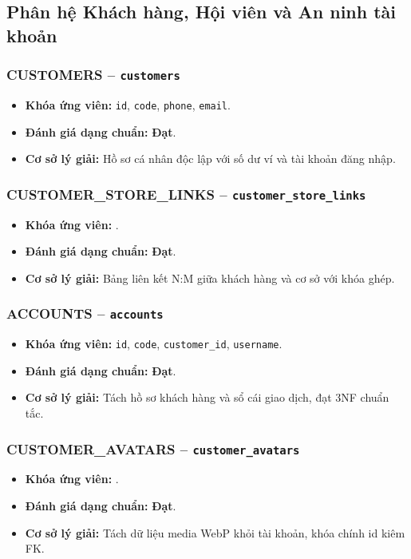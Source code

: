 \subsection{Phân hệ Khách hàng, Hội viên và An ninh tài khoản}
\subsubsection{CUSTOMERS -- \texttt{customers}}
\begin{itemize}
  \item \textbf{Khóa ứng viên:} \texttt{id}, \texttt{code}, \texttt{phone}, \texttt{email}.
  \item \textbf{Đánh giá dạng chuẩn:} \textbf{Đạt}.
  \item \textbf{Cơ sở lý giải:} Hồ sơ cá nhân độc lập với số dư ví và tài khoản đăng nhập.
\end{itemize}

\subsubsection{CUSTOMER_STORE_LINKS -- \texttt{customer\_store\_links}}
\begin{itemize}
  \item \textbf{Khóa ứng viên:} \texttt{}.
  \item \textbf{Đánh giá dạng chuẩn:} \textbf{Đạt}.
  \item \textbf{Cơ sở lý giải:} Bảng liên kết N:M giữa khách hàng và cơ sở với khóa ghép.
\end{itemize}

\subsubsection{ACCOUNTS -- \texttt{accounts}}
\begin{itemize}
  \item \textbf{Khóa ứng viên:} \texttt{id}, \texttt{code}, \texttt{customer\_id}, \texttt{username}.
  \item \textbf{Đánh giá dạng chuẩn:} \textbf{Đạt}.
  \item \textbf{Cơ sở lý giải:} Tách hồ sơ khách hàng và sổ cái giao dịch, đạt 3NF chuẩn tắc.
\end{itemize}

\subsubsection{CUSTOMER_AVATARS -- \texttt{customer\_avatars}}
\begin{itemize}
  \item \textbf{Khóa ứng viên:} \texttt{}.
  \item \textbf{Đánh giá dạng chuẩn:} \textbf{Đạt}.
  \item \textbf{Cơ sở lý giải:} Tách dữ liệu media WebP khỏi tài khoản, khóa chính id kiêm FK.
\end{itemize}

